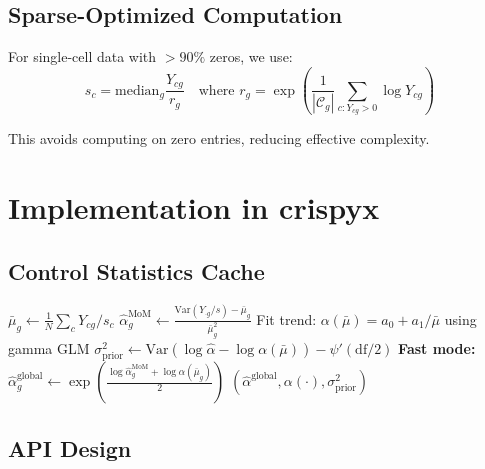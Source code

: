 \documentclass[11pt]{article}
\theoremstyle{definition}
\theoremstyle{remark}
\begin{document}
\subsection{Sparse-Optimized Computation}

For single-cell data with $>90\%$ zeros, we use:
\begin{equation}
s_c = \text{median}_g \frac{Y_{cg}}{r_g} \quad \text{where } r_g = \exp\left(\frac{1}{|\mathcal{C}_g|}\sum_{c: Y_{cg}>0} \log Y_{cg}\right)
\end{equation}

This avoids computing on zero entries, reducing effective complexity.

\section{Implementation in crispyx}

\subsection{Control Statistics Cache}

\begin{algorithm}
\caption{Global Dispersion Precomputation (Fast Mode)}
\begin{algorithmic}[1]
    \State $\bar{\mu}_g \gets \frac{1}{N}\sum_c Y_{cg}/s_c$ 
    \State $\hat{\alpha}_g^{\text{MoM}} \gets \frac{\text{Var}(Y_{\cdot g}/s) - \bar{\mu}_g}{\bar{\mu}_g^2}$ 
    \State Fit trend: $\alpha(\bar{\mu}) = a_0 + a_1/\bar{\mu}$ using gamma GLM
    \State $\sigma_{\text{prior}}^2 \gets \text{Var}(\log \hat{\alpha} - \log \alpha(\bar{\mu})) - \psi'(\text{df}/2)$
    \State \textbf{Fast mode:} $\hat{\alpha}_g^{\text{global}} \gets \exp\left(\frac{\log\hat{\alpha}_g^{\text{MoM}} + \log\alpha(\bar{\mu}_g)}{2}\right)$ 
    \State \Return $(\hat{\alpha}^{\text{global}}, \alpha(\cdot), \sigma_{\text{prior}}^2)$
\EndProcedure
\end{algorithmic}
\end{algorithm}

\subsection{API Design}
\end{document}
